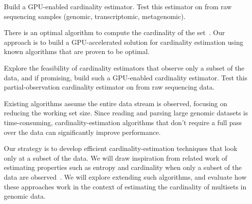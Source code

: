 \begin{rproblem}
Build a GPU-enabled cardinality estimator.  Test this estimator on \kmers from raw sequencing samples (genomic, transcriptomic, metagenomic).
\end{rproblem}

There is an optimal algorithm to compute the cardinality of the set~\cite{Kane2010}.
Our approach is to build a GPU-accelerated solution for cardinality estimation using known algorithms that are proven to be optimal.

\begin{rproblem}
Explore the feasibility of cardinality estimators that observe only a  subset of the data, and if promising, build such a GPU-enabled cardinality estimator. Test this partial-observation cardinality estimator on \kmers from raw sequencing data.
\end{rproblem}

Existing algorithms assume the entire data stream is observed, focusing on reducing the working set size. Since reading and parsing large genomic datasets is time-consuming, cardinality-estimation algorithms that don't require a full pass over the data can significantly improve performance.



Our strategy is to develop efficient cardinality-estimation techniques that look only at a subset of the data. 
We will draw inspiration from related work of estimating properties such as entropy and cardinality when only a subset of the data are observed~\cite{valiant2017estimating}.  We will explore extending such algorithms, and evaluate how these approaches work in the context of estimating the cardinality of \kmer multisets in genomic data.  
